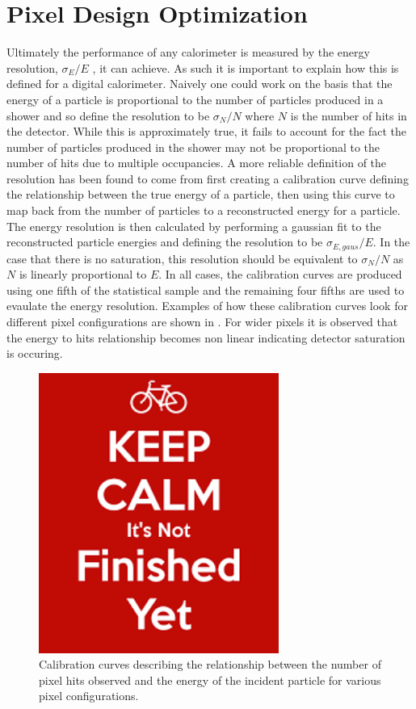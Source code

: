 \section{Pixel Design Optimization}

Ultimately the performance of any calorimeter is measured by the energy resolution, $\sigma_E/E$ , it can achieve. As such it is important to explain how this is defined for a digital calorimeter. Naively one could work on the basis that the energy of a particle is proportional to the number of particles produced in a shower and so define the resolution to be $\sigma_N/N$ where $N$ is the number of hits in the detector. While this is approximately true, it fails to account for the fact the number of particles produced in the shower may not be proportional to the number of hits due to multiple occupancies. A more reliable definition of the resolution has been found to come from first creating a calibration curve defining the relationship between the true energy of a particle, then using this curve to map back from the number of particles to a reconstructed energy for a particle. The energy resolution is then calculated by performing a gaussian fit to the reconstructed particle energies and defining the resolution to be $\sigma_{E,gaus}/E$. In the case that there is no saturation, this resolution should be equivalent to $\sigma_N/N$ as $N$ is linearly proportional to $E$. In all cases, the calibration curves are produced using one fifth of the statistical sample and the remaining four fifths are used to evaulate the energy resolution. Examples of how these calibration curves look for different pixel configurations are shown in . For wider pixels it is observed that the energy to hits relationship becomes non linear indicating detector saturation is occuring. 

\begin{figure}
  \centering
  \includegraphics[width=0.7\textwidth,keepaspectratio]{DECALStudies/fig/dummy}
  \caption{Calibration curves describing the relationship between the number of pixel hits observed and the energy of the incident particle for various pixel configurations.}
  \label{fig:calibrationcurves}
\end{figure}

